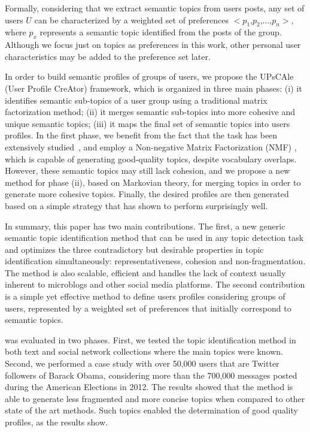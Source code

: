 Formally, considering that we extract semantic topics from users posts, any set
of users $U$ can be characterized by a weighted set of preferences
$<$$p_1$,$p_2$,$\ldots$,$p_n$$>$, where $p_x$ represents a semantic topic
identified from the posts of the group. Although we focus just on topics as
preferences in this work, other personal user characteristics may be added to
the preference set later.

In order to build semantic profiles of groups of users, we propose the UPsCAle
(User Profile CreAtor) framework, which is organized in three main phases: (i)
it identifies semantic sub-topics of a user group using a traditional matrix
factorization method; (ii) it merges semantic sub-topics into more cohesive and
unique semantic topics; (iii) it maps the final set of semantic topics into
users profiles.  In the first phase, we benefit from the fact that the task has
been extensively studied~\cite{pons2007topic}, and employ a Non-negative Matrix
Factorization (NMF) \cite{berry2007algorithms}, which is capable of generating
good-quality topics, despite vocabulary overlaps.  However, these semantic
topics may still lack cohesion\cite{cheng:2013}, and we propose a new method
for phase (ii), based on Markovian theory, for merging topics in order to
generate more cohesive topics.  Finally, the desired profiles are then
generated based on a simple strategy that has shown to perform surprisingly
well.

In summary, this paper has two main contributions. The first, a new generic
semantic topic identification method that can be used in any topic detection
task and optimizes the three contradictory but desirable properties in topic
identification simultaneously: representativeness, cohesion and
non-fragmentation. The method is also scalable, efficient and handles the lack
of context usually inherent to microblogs and other social media platforms.
The second contribution is a simple yet effective method to define users
profiles considering groups of users, represented by a weighted set of
preferences that initially correspond to semantic topics. 

\method was evaluated in two phases. First, we tested the topic identification
method in both text and social network collections where the main topics were
known. Second, we performed a case study with over 50,000 users that are
Twitter followers of Barack Obama, considering more than the 700,000 messages
posted during the American Elections in 2012. The results showed that the
method is able to generate less fragmented and more concise topics when
compared to other state of the art methods.%
Such topics enabled the determination of good quality profiles, as the results
show.

